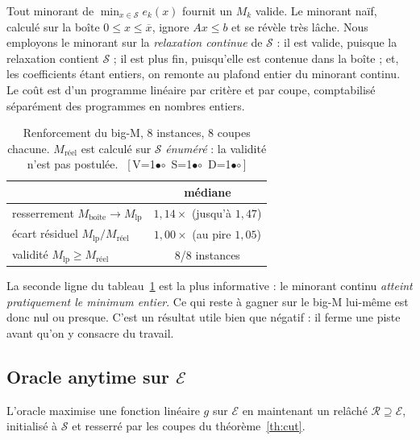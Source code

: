 \documentclass[11pt,a4paper]{article}
\theoremstyle{plain}
\theoremstyle{remark}
\newcommand{\Ecal}{\mathcal{E}}
\newcommand{\Scal}{\mathcal{S}}
\newcommand{\Rcal}{\mathcal{R}}
\newcommand{\cfgm}[1]{\ifnum#1=1$\bullet$\else$\circ$\fi}
\newcommand{\conf}[3]{%
  \textsf{\footnotesize[\,V\cfgm{#1}\ S\cfgm{#2}\ D\cfgm{#3}\,]}}
\begin{document}
Tout minorant de $\min_{x\in\Scal}e_k(x)$ fournit un $M_k$ valide. Le
minorant naïf, calculé sur la boîte $0\le x\le\overline{x}$, ignore
$Ax\le b$ et se révèle très lâche. Nous employons le minorant sur la
\emph{relaxation continue} de $\Scal$ : il est valide, puisque la relaxation
contient $\Scal$ ; il est plus fin, puisqu'elle est contenue dans la boîte ;
et, les coefficients étant entiers, on remonte au plafond entier du minorant
continu. Le coût est d'un programme linéaire par critère et par coupe,
comptabilisé séparément des programmes en nombres entiers.

\begin{table}[H]
\centering
\caption{Renforcement du big-M, 8 instances, 8 coupes chacune. $M_{\text{réel}}$
est calculé sur $\Scal$ \emph{énuméré} : la validité n'est pas postulée.\ \conf{0}{0}{0}}
\label{tab:bigm}
\begin{tabular}{lc}
\toprule
& médiane\\
\midrule
resserrement $M_{\text{boîte}}\to M_{\text{lp}}$ & $1{,}14\times$ (jusqu'à $1{,}47$)\\
écart résiduel $M_{\text{lp}}/M_{\text{réel}}$ & $1{,}00\times$ (au pire $1{,}05$)\\
validité $M_{\text{lp}}\ge M_{\text{réel}}$ & 8/8 instances\\
\bottomrule
\end{tabular}
\end{table}

\noindent
La seconde ligne du tableau~\ref{tab:bigm} est la plus informative : le
minorant continu \emph{atteint pratiquement le minimum entier}. Ce qui reste
à gagner sur le big-M lui-même est donc nul ou presque. C'est un résultat
utile bien que négatif : il ferme une piste avant qu'on y consacre du travail.

\subsection{Oracle anytime sur \texorpdfstring{$\Ecal$}{E}}
\label{sec:oracle}

L'oracle maximise une fonction linéaire $g$ sur $\Ecal$ en maintenant un
relâché $\Rcal\supseteq\Ecal$, initialisé à $\Scal$ et resserré par les
coupes du théorème~\ref{th:cut}.
\end{document}
